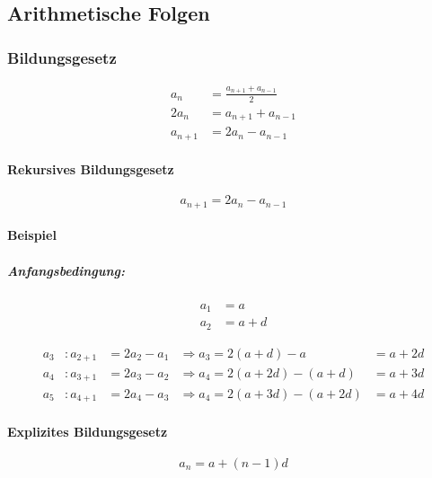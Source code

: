 \subsection{Arithmetische Folgen}

\subsubsection{Bildungsgesetz}

\begin{align*}
	a_n     & = \frac{a_{n+1} + a_{n-1}}{2} \\
	2 a_n   & = a_{n+1} + a_{n-1}           \\
	a_{n+1} & = 2 a_n - a_{n-1}
\end{align*}

\begin{gesetz}
	\paragraph{Rekursives Bildungsgesetz}

	\[
		a_{n+1} = 2 a_n - a_{n-1}
	\]
\end{gesetz}

\paragraph{Beispiel}

\subparagraph{Anfangsbedingung:}

\begin{align*}
	a_1 & = a     \\
	a_2 & = a + d
\end{align*}

\[
	\begin{alignedat}{4}
		a_3 & : a_{2+1} & = 2a_2 - a_1 & \Rightarrow a_3 = 2(a+d) - a       & = a + 2d \\
		a_4 & : a_{3+1} & = 2a_3 - a_2 & \Rightarrow a_4 = 2(a+2d) - (a+d)  & = a + 3d \\
		a_5 & : a_{4+1} & = 2a_4 - a_3 & \Rightarrow a_4 = 2(a+3d) - (a+2d) & = a + 4d
	\end{alignedat}
\]


\begin{gesetz}
	\paragraph{Explizites Bildungsgesetz}

	\[
		a_n = a + (n - 1)d
	\]
\end{gesetz}

